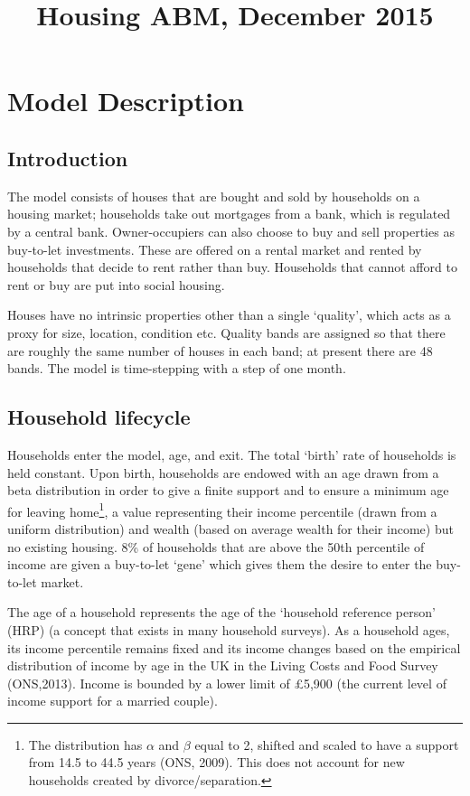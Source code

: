 \documentclass{report}
\begin{document}
\title{Housing ABM, December 2015}
\maketitle
\tableofcontents
\chapter{Model Description}

\section{Introduction}
The model consists of houses that are bought and sold by households on a housing market; households take out mortgages from a bank, which is regulated by a central bank. Owner-occupiers can also choose to buy and sell properties as buy-to-let investments. These are offered on a rental market and rented by households that decide to rent rather than buy. Households that cannot afford to rent or buy are put into social housing.

Houses have no intrinsic properties other than a single `quality', which acts as a proxy for size, location, condition etc. Quality bands are assigned so that there are roughly the same number of houses in each band; at present there are 48 bands. The model is time-stepping with a step of one month.

\section{Household lifecycle}
\label{lifecycle}
Households enter the model, age, and exit. The total `birth' rate of households is held constant. Upon birth, households are endowed with an age drawn from a beta distribution in order to give a finite support and to ensure a minimum age for leaving home\footnote{The distribution has $\alpha$ and $\beta$ equal to 2, shifted and scaled to have a support from 14.5 to 44.5 years (ONS, 2009). This does not account for new households created by divorce/separation.}, a value representing their income percentile (drawn from a uniform distribution) and wealth (based on average wealth for their income) but no existing housing. 8\% of households that are above the 50th percentile of income are given a buy-to-let `gene' which gives them the desire to enter the buy-to-let market.

The age of a household represents the age of the `household reference person' (HRP) (a concept that exists in many household surveys). As a household ages, its income percentile remains fixed and its income changes based on the empirical distribution of income by age in the UK in the Living Costs and Food Survey (ONS,2013). Income is bounded by a lower limit of \pounds 5,900 (the current level of income support for a married couple).
\end{document}
